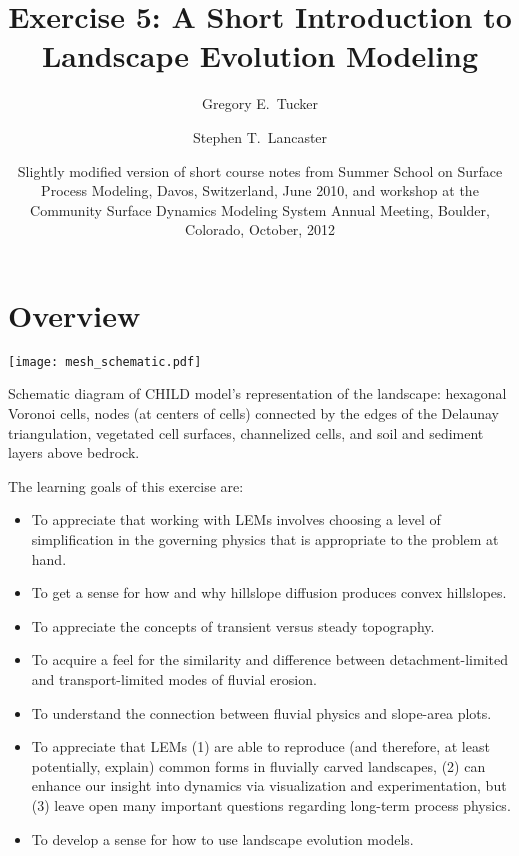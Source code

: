 \documentclass[12pt,reqno]{amsart}
\title{Exercise 5: A Short Introduction to Landscape Evolution Modeling}
\author{Gregory E.\ Tucker}
\author{Stephen T.\ Lancaster}
\date{Slightly modified version of short course notes from Summer
  School on Surface Process Modeling, Davos, Switzerland, June 2010,
  and workshop at the Community Surface Dynamics Modeling System
  Annual Meeting, Boulder, Colorado, October, 2012} %
\begin{document}
\maketitle
\tableofcontents


\section{Overview}

\begin{floatingfigure}{0.5\textwidth}
\centering
\texttt{[image: mesh\_schematic.pdf]}
\captionsetup{width=0.45\textwidth}
\caption{Schematic diagram of CHILD model's representation of the landscape: hexagonal Voronoi cells, nodes (at centers of cells) connected by the edges of the Delaunay triangulation, vegetated cell surfaces, channelized cells, and soil and sediment layers above bedrock.}
\label{fig:schem}
\end{floatingfigure}

The learning goals of this exercise are:
\begin{itemize}
\item{To appreciate that working with LEMs involves choosing a level of simplification in the governing physics that is appropriate to the problem at hand.}
\item{To get a sense for how and why hillslope diffusion produces convex hillslopes.}
\item{To appreciate the concepts of transient versus steady topography.}
\item{To acquire a feel for the similarity and difference between detachment-limited and transport-limited modes of fluvial erosion.}
\item{To understand the connection between fluvial physics and slope-area plots.}
\item{To appreciate that LEMs (1) are able to reproduce (and therefore, at least potentially, explain) common forms in fluvially carved landscapes, (2) can enhance our insight into dynamics via visualization and experimentation, but (3) leave open many important questions regarding long-term process physics.}
\item{To develop a sense for how to use landscape evolution models.}
\end{itemize}
\end{document}
